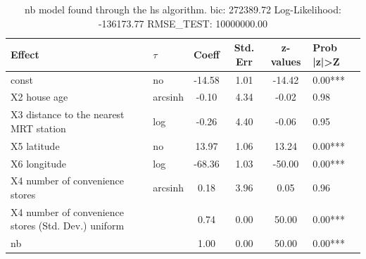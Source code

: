 \begin{table}
	\caption{nb model found through the hs algorithm. bic: 272389.72 Log-Likelihood: -136173.77 RMSE_TEST: 10000000.00}
	\begin{center}
		\begin{tabular}{|l|l|c|c|c|l|}
			\hline
			Effect & $\tau$ & Coeff & Std. Err & z-values & Prob |z|>Z \\
			\hline
			const & no & -14.58 & 1.01 & -14.42 & 0.00*** \\
			\hline
			X2 house age & arcsinh & -0.10 & 4.34 & -0.02 & 0.98 \\
			\hline
			X3 distance to the nearest MRT station & log & -0.26 & 4.40 & -0.06 & 0.95 \\
			\hline
			X5 latitude & no & 13.97 & 1.06 & 13.24 & 0.00*** \\
			\hline
			X6 longitude & log & -68.36 & 1.03 & -50.00 & 0.00*** \\
			\hline
			X4 number of convenience stores & arcsinh & 0.18 & 3.96 & 0.05 & 0.96 \\
			\hline
			X4 number of convenience stores (Std. Dev.) uniform &  & 0.74 & 0.00 & 50.00 & 0.00*** \\
			\hline
			nb &  & 1.00 & 0.00 & 50.00 & 0.00*** \\
			\hline
		\end{tabular}
	\end{center}
\end{table}